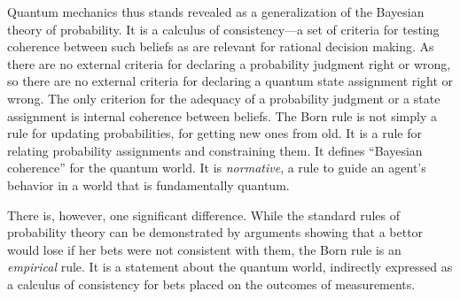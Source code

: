 \documentclass[12pt]{article}
\begin{document}
Quantum mechanics thus stands revealed as a generalization of the Bayesian theory of probability. It is a calculus of consistency---a set of criteria for testing coherence between such beliefs as are relevant for rational decision making. As there are no {external} criteria for declaring a probability judgment right or wrong, so there are no {external} criteria for declaring a quantum state assignment right or wrong. The only criterion for the adequacy of a probability judgment or a state assignment is internal coherence between beliefs. The Born rule is not simply a rule for {updating} probabilities, for getting new ones from old. It is a rule for {relating} probability assignments and {constraining} them. It defines ``Bayesian coherence'' for the quantum world. It is \emph{normative}, a rule to guide an agent's behavior in a world that is fundamentally quantum.

There is, however, one significant difference. While the standard rules of probability theory can be demonstrated by arguments showing that a bettor would lose if her bets were not consistent with them, the Born rule is an \emph{empirical} rule. It is a statement about the quantum world, indirectly expressed as a calculus of consistency for bets placed on the outcomes of measurements.
\end{document}
